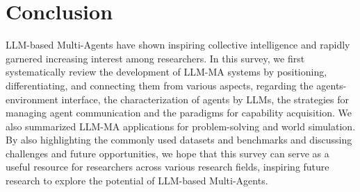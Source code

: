 \section{Conclusion}
\label{Sec8:Conclusion}
LLM-based Multi-Agents have shown inspiring collective intelligence and rapidly garnered increasing interest among researchers.
In this survey, we first systematically review the development of LLM-MA systems by positioning, differentiating, and connecting them from various aspects, regarding the agents-environment interface, the characterization of agents by LLMs, the strategies for managing agent communication and the paradigms for capability acquisition. We also summarized  LLM-MA applications for problem-solving and world simulation. By also highlighting the commonly used datasets and benchmarks and discussing challenges and future opportunities, we hope that this survey can serve as a useful resource for researchers across various research fields, inspiring future research to explore the potential of LLM-based Multi-Agents.


 